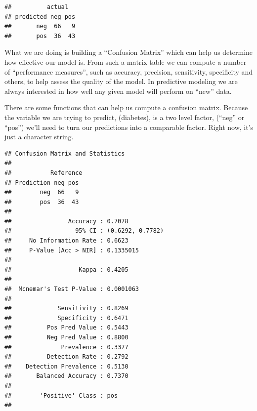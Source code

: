 \documentclass[
]{book}
\newenvironment{Shaded}{\begin{snugshade}}{\end{snugshade}}
\newcommand{\CommentTok}[1]{\textcolor[rgb]{0.56,0.35,0.01}{\textit{#1}}}
\newcommand{\DataTypeTok}[1]{\textcolor[rgb]{0.13,0.29,0.53}{#1}}
\newcommand{\KeywordTok}[1]{\textcolor[rgb]{0.13,0.29,0.53}{\textbf{#1}}}
\newcommand{\NormalTok}[1]{#1}
\newcommand{\OperatorTok}[1]{\textcolor[rgb]{0.81,0.36,0.00}{\textbf{#1}}}
\newcommand{\StringTok}[1]{\textcolor[rgb]{0.31,0.60,0.02}{#1}}
\begin{document}
\begin{verbatim}
##          actual
## predicted neg pos
##       neg  66   9
##       pos  36  43
\end{verbatim}

What we are doing is building a ``Confusion Matrix'' which can help us determine how effective our model is. From such a matrix table we can compute a number of ``performance measures'', such as accuracy, precision, sensitivity, specificity and others, to help assess the quality of the model. In predictive modeling we are always interested in how well any given model will perform on ``new'' data.

There are some functions that can help us compute a confusion matrix. Because the variable we are trying to predict, (diabetes), is a two level factor, (``neg'' or ``pos'') we'll need to turn our predictions into a comparable factor. Right now, it's just a character string.

\begin{Shaded}
\end{Shaded}

\begin{verbatim}
## Confusion Matrix and Statistics
## 
##           Reference
## Prediction neg pos
##        neg  66   9
##        pos  36  43
##                                           
##                Accuracy : 0.7078          
##                  95% CI : (0.6292, 0.7782)
##     No Information Rate : 0.6623          
##     P-Value [Acc > NIR] : 0.1335015       
##                                           
##                   Kappa : 0.4205          
##                                           
##  Mcnemar's Test P-Value : 0.0001063       
##                                           
##             Sensitivity : 0.8269          
##             Specificity : 0.6471          
##          Pos Pred Value : 0.5443          
##          Neg Pred Value : 0.8800          
##              Prevalence : 0.3377          
##          Detection Rate : 0.2792          
##    Detection Prevalence : 0.5130          
##       Balanced Accuracy : 0.7370          
##                                           
##        'Positive' Class : pos             
## 
\end{verbatim}
\end{document}
